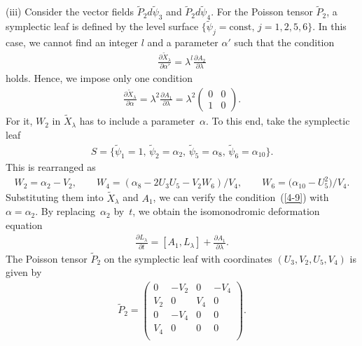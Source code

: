 \documentclass[10pt,a4paper]{amsart}
\numberwithin{equation}{section}
\begin{document}
(iii) Consider the vector f\/ields $\widetilde{P}_2 d\widetilde{\psi}_3$ and $\widetilde{P}_2 d\widetilde{\psi}_4$. For the Poisson tensor $\widetilde{P}_2$, a symplectic leaf is def\/ined by the level surface $\{ \widetilde{\psi}_j = \text{const},\, j=1,2,5,6\}$. In this case, we cannot f\/ind an integer $l$ and a parameter $\alpha '$ such that the condition
\begin{gather*}
\frac{\partial \widetilde{X}_\lambda }{\partial \alpha'} = \lambda^l \frac{\partial A_2 }{\partial \lambda }
\end{gather*}
holds. Hence, we impose only one condition
\begin{gather}
\frac{\partial \widetilde{X}_\lambda }{\partial \alpha} = \lambda^2 \frac{\partial A_1 }{\partial \lambda } = \lambda^2 \left(
\begin{matrix}
0 & 0 \\
1 & 0
\end{matrix}
\right).\label{4-9}
\end{gather}
For it, $W_2$ in $\widetilde{X}_\lambda $ has to include a parameter~$\alpha $. To this end, take the symplectic leaf
\begin{gather*}
S = \big\{ \widetilde{\psi}_1 = 1,\, \widetilde{\psi}_2 = \alpha _2 ,\, \widetilde{\psi}_5 = \alpha _{8},\, \widetilde{\psi}_6 = \alpha _{10} \big\}.
\end{gather*}
This is rearranged as
\begin{gather*}
W_2 = \alpha _2 - V_2,\qquad W_4 = (\alpha _8 - 2U_3U_5 - V_2W_6)/V_4,\qquad W_6 = \big(\alpha _{10} - U_5^2\big)/V_4.
\end{gather*}
Substituting them into $\widetilde{X}_\lambda$ and $A_1$, we can verify the condition~(\ref{4-9}) with $\alpha = \alpha _2$. By re\-pla\-cing~$\alpha _2$ by~$t$, we obtain the isomonodromic deformation equation
\begin{gather*}
\frac{\partial L_\lambda }{\partial t} = [A_1, L_\lambda ]+ \frac{\partial A_1}{\partial \lambda } .
\end{gather*}
The Poisson tensor $\widetilde{P}_2$ on the symplectic leaf with coordinates $(U_3, V_2 ,U_5, V_4)$ is given by
\begin{gather*}
\widetilde{P}_2 = \left(
\begin{matrix}
0 &-V_2 &0 & -V_4 \\
V_2 &0 & V_4 &0 \\
0& -V_4 &0 &0 \\
V_4&0 &0 &0 \\
\end{matrix}
\right).
\end{gather*}
\end{document}
